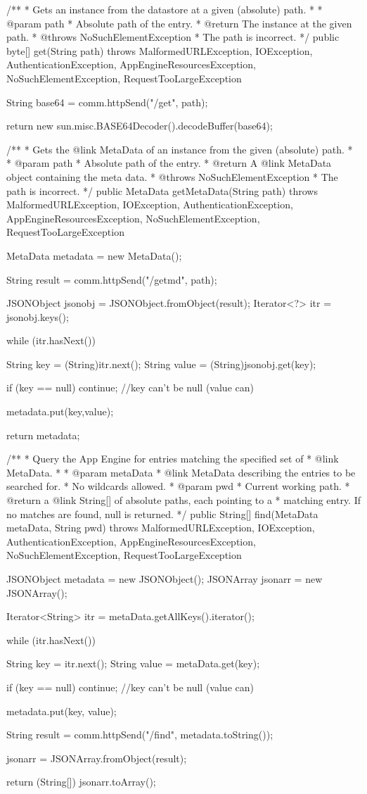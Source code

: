 \begin{code}
{	/**
	 * Gets an instance from the datastore at a given (absolute) path.
	 * 
	 * @param path
	 *            Absolute path of the entry.
	 * @return The instance at the given path.
	 * @throws NoSuchElementException
	 *             The path is incorrect.
	 */
	public byte[] get(String path) 
	  throws MalformedURLException, IOException, AuthenticationException,
	  AppEngineResourcesException, NoSuchElementException, 
	  RequestTooLargeException {
		String base64 = comm.httpSend("/get", path);
		
		return new sun.misc.BASE64Decoder().decodeBuffer(base64);
	}

	/**
	 * Gets the {@link MetaData} of an instance from the given (absolute) path.
	 * 
	 * @param path
	 *            Absolute path of the entry.
	 * @return A {@link MetaData} object containing the meta data.
	 * @throws NoSuchElementException
	 *             The path is incorrect.
	 */
	public MetaData getMetaData(String path) 
	  throws MalformedURLException, IOException, AuthenticationException,
	  AppEngineResourcesException, NoSuchElementException, 
	  RequestTooLargeException {
		MetaData   metadata = new MetaData();
		
		String result = comm.httpSend("/getmd", path);
		
		JSONObject jsonobj = JSONObject.fromObject(result);
		Iterator<?> itr    = jsonobj.keys();
		
		while (itr.hasNext()) {
			String key   = (String)itr.next();
			String value = (String)jsonobj.get(key);

			if (key == null) {
				continue; //key can't be null (value can)
			}
			
			metadata.put(key,value);
		}

		return metadata;
	}

	/**
	 * Query the App Engine for entries matching the specified set of
	 * {@link MetaData}.
	 * 
	 * @param metaData
	 *            {@link MetaData} describing the entries to be searched for.
	 *            No wildcards allowed.
	 * @param pwd
	 *            Current working path.
	 * @return a {@link String}[] of absolute paths, each pointing to a
	 *         matching entry. If no matches are found, null is returned.
	 */
	public String[] find(MetaData metaData, String pwd)
	  throws MalformedURLException, IOException, AuthenticationException,
	  AppEngineResourcesException, NoSuchElementException, 
	  RequestTooLargeException {
		JSONObject metadata = new JSONObject();
		JSONArray  jsonarr  = new JSONArray();
		
		Iterator<String> itr  = metaData.getAllKeys().iterator();
		
		while (itr.hasNext()) {
			String key   = itr.next();
			String value = metaData.get(key);

			if (key == null) {
				continue; //key can't be null (value can)
			}
			
			metadata.put(key, value);
		}
				
		String result = comm.httpSend("/find", metadata.toString());
		
		jsonarr = JSONArray.fromObject(result);
		
		return (String[]) jsonarr.toArray();
	}
}
\end{code}


